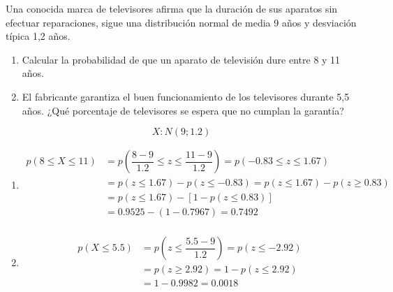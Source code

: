 \begin{exercise}
  Una conocida marca de televisores afirma que la duración de sus aparatos sin efectuar reparaciones, sigue una distribución normal de media 9 años y desviación típica 1,2 años.

  \begin{enumerate}[label=\alph* )]
  \item Calcular la probabilidad de que un aparato de televisión dure entre 8 y 11 años.
  \item El fabricante garantiza el buen funcionamiento de los televisores durante 5,5 años. ¿Qué porcentaje de televisores se espera que no cumplan la garantía?              
  \end{enumerate}

  \tcblower

  \[ X:N(9; 1.2) \]

  \begin{enumerate}[label=\alph* )]
  \item
  \begin{align*}
  p(8 \leq X \leq 11) & = p \left( \dfrac{8-9}{1.2} \leq z \leq \dfrac{11-9}{1.2} \right) =p(-0.83 \leq z \leq 1.67)   \\
  & =p(z \leq 1.67)-p(z \leq -0.83)= p(z\leq 1.67)-p(z \geq 0.83) \\
  & =p(z \leq 1.67)-[1-p(z \leq 0.83)] \\
  &  =0.9525-(1-0.7967)=0.7492 \\
  \end{align*}
  \item
  \begin{align*}
  p(X \leq 5.5) & = p \left( z \leq \dfrac{5.5-9}{1.2} \right)= p(z \leq -2.92) \\
  & = p(z \geq 2.92)= 1-p(z \leq 2.92) \\
  & = 1-0.9982 = 0.0018 \\
  \end{align*}         
  \end{enumerate}
\end{exercise}

